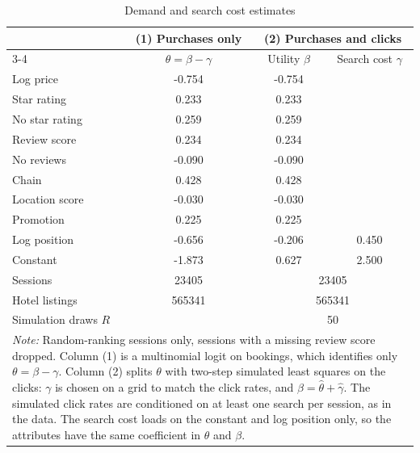\begin{table}[htbp]
\centering
\caption{Demand and search cost estimates}
\label{tab:search_estimates}
\begin{tabular}{lccc}
\toprule
 & (1) Purchases only & \multicolumn{2}{c}{(2) Purchases and clicks} \\
\cmidrule(lr){3-4}
 & $\theta = \beta - \gamma$ & Utility $\beta$ & Search cost $\gamma$ \\
\midrule
Log price & -0.754 & -0.754 & \\
Star rating & 0.233 & 0.233 & \\
No star rating & 0.259 & 0.259 & \\
Review score & 0.234 & 0.234 & \\
No reviews & -0.090 & -0.090 & \\
Chain & 0.428 & 0.428 & \\
Location score & -0.030 & -0.030 & \\
Promotion & 0.225 & 0.225 & \\
\midrule
Log position & -0.656 & -0.206 & 0.450 \\
Constant & -1.873 & 0.627 & 2.500 \\
\midrule
Sessions & 23405 & \multicolumn{2}{c}{23405} \\
Hotel listings & 565341 & \multicolumn{2}{c}{565341} \\
Simulation draws $R$ & & \multicolumn{2}{c}{50} \\
\bottomrule
\multicolumn{4}{p{0.9\linewidth}}{\footnotesize \textit{Note:} Random-ranking sessions only, sessions with a missing review score dropped. Column (1) is a multinomial logit on bookings, which identifies only $\theta = \beta - \gamma$. Column (2) splits $\theta$ with two-step simulated least squares on the clicks: $\gamma$ is chosen on a grid to match the click rates, and $\beta = \hat\theta + \hat\gamma$. The simulated click rates are conditioned on at least one search per session, as in the data. The search cost loads on the constant and log position only, so the attributes have the same coefficient in $\theta$ and $\beta$.} \\
\end{tabular}
\end{table}
